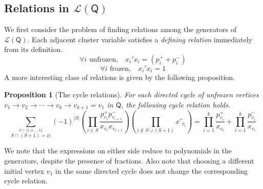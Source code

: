 \documentclass[10pt]{amsart}
\numberwithin{equation}{section}
\newtheorem{prop}[thm]{Proposition}
\theoremstyle{definition}
\theoremstyle{remark}
\renewcommand{\L}{\mathcal{L}}%
\renewcommand{\emptyset}{\varnothing}
\newcommand{\1}{^{-1}}
\def\Q{\mathsf{Q}}
\begin{document}
\subsection{Relations in $\L(\Q)$}

We first consider the problem of finding relations among the generators of $\L(\Q)$.
%
%
Each adjacent cluster variable satisfies a \textit{defining relation} immediately from its definition.
\begin{equation}
\forall i \text{ unfrozen} ,\; \;\; x_i'x_i = (p_i^++p_i^-) 
\end{equation}
\begin{equation}
\forall i \text{ frozen} ,\; \;\;x_i'x_i =1
\end{equation}
A more interesting class of relations is given by the following proposition.
\begin{prop}[The cycle relations]\label{prop: cyclerels}
For each directed cycle of unfrozen vertices $v_1\rightarrow v_2 \rightarrow \cdots \rightarrow v_k\rightarrow v_{k+1}=v_1$ in $\Q$, the following \textit{cycle relation} holds.
\begin{equation}%
\sum_{\stackrel{S\subset \{1,2,\dots,k\}}{S\cap (S+1)=\emptyset}} (-1)^{|S|}\left(\prod_{i\in S} \frac{p_{v_i}^+p_{v_{i+1}}^-}{x_{v_i}x_{v_{i+1}}}\right)\left(\prod_{i\not\in S\cup (S+1)} x'_{v_i}\right) = \prod_{i=1}^k\frac{p_{v_i}^+}{x_{v_i}}+ \prod_{i=1}^k\frac{p_{v_i}^-}{x_{v_i}}
\end{equation}
\end{prop}
\noindent We note that the expressions on either side reduce to polynomials in the generators, despite the presence of fractions.  Also note that choosing a different initial vertex $v_1$ in the same directed cycle does not change the corresponding cycle relation.

\end{document}
